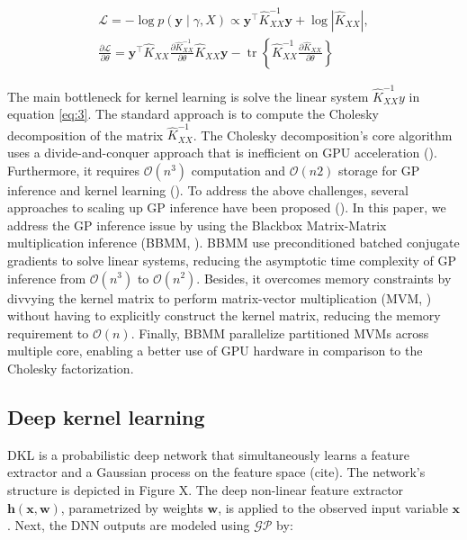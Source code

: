 \documentclass[a4paper, nobind]{templates/cdethesis}
\begin{document}
\begin{equation}
\begin{aligned}
\mathcal{L} = - \log p(\mathbf{y} \mid \gamma, X) \propto \mathbf{y}^{\top} \widehat{K}_{XX}^{-1} \mathbf{y} + \log \left|\widehat{K}_{X X}\right|, \\
\frac{\partial \mathcal{L}}{\partial \theta} = \mathbf{y}^{\top} \widehat{K}_{XX} \frac{\partial \widehat{K}_{X X}^{-1}}{\partial \theta} \widehat{K}_{X X} \mathbf{y}-\operatorname{tr}\left\{\widehat{K}_{X X}^{-1} \frac{\partial \widehat{K}_{XX}}{\partial \theta}\right\}
\label{eq:3}
\end{aligned}
\end{equation}

The main bottleneck for kernel learning is solve the linear system \(\widehat{K}_{XX}^{-1}y\) in equation \ref{eq:3}. The standard approach is to compute the Cholesky decomposition of the matrix \(\widehat{K}_{XX}^{-1}\). The Cholesky decomposition's core algorithm
uses a divide-and-conquer approach that is inefficient on GPU acceleration (\cite{krishnamoorthy2013matrix}). Furthermore, it requires \(\mathcal{O}(n^{3})\) computation and \(\mathcal{O}(n2)\) storage for GP inference and kernel learning (\cite{rasmussen2003gaussian}). To address the above challenges, several approaches to scaling up GP inference have been proposed (\cite{gardner2018gpytorch, cunningham2008fast, dong2017scalable, bach2013sharp, wilson2015thoughts}). In this paper, we address the GP inference issue by using the Blackbox Matrix-Matrix multiplication inference (BBMM, \cite{gardner2018gpytorch}). BBMM use preconditioned batched conjugate gradients to solve linear systems, reducing the asymptotic time complexity of GP inference from \(\mathcal{O}(n^{3})\) to \(\mathcal{O}(n^{2})\). Besides, it overcomes memory constraints by divvying the kernel matrix to perform matrix-vector multiplication (MVM, \cite{demmel1997applied}) without having to explicitly construct the kernel matrix, reducing the memory requirement to \(\mathcal{O}(n)\). Finally, BBMM parallelize partitioned MVMs across multiple core, enabling a better use of GPU hardware in comparison to the Cholesky factorization.

\hypertarget{deep-kernel-learning}{%
\subsection{Deep kernel learning}\label{deep-kernel-learning}}

DKL is a probabilistic deep network that simultaneously learns a feature
extractor and a Gaussian process on the feature space (cite). The network's
structure is depicted in Figure X. The deep non-linear feature extractor
\(\mathbf{h(x,w)}\), parametrized by weights \(\mathbf{w}\), is applied to the
observed input variable \(\mathbf{x}\). Next, the DNN outputs are modeled using
\(\mathcal{GP}\) by:
\end{document}
